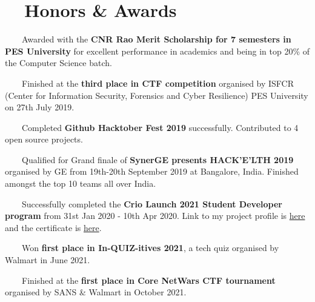 \documentclass[a4paper,20pt]{article}
\begin{document}
\section{~~Honors \& Awards}
\begin{description}[font=$\bullet$]
\item{~~~~Awarded with the \textbf{CNR Rao Merit Scholarship for 7 semesters in PES University} for excellent performance in academics and being in top 20\% of the Computer Science batch.}
\vspace{-5pt}
\item {~~~~Finished at the \textbf{third place in CTF competition} organised by ISFCR (Center for Information Security, Forensics and Cyber Resilience) PES University on 27th July 2019.}
\vspace{-5pt}
\item {~~~~Completed \textbf{Github Hacktober Fest 2019} successfully. Contributed to 4 open source projects.}
\vspace{-5pt}
\item {~~~~Qualified for Grand finale of \textbf{SynerGE presents HACK'E'LTH 2019} organised by GE from 19th-20th September 2019 at Bangalore, India. Finished amongst the top 10 teams all over India.}
\vspace{-5pt}
\item {~~~~Successfully completed the \textbf{Crio Launch 2021 Student Developer program} from 31st Jan 2020 - 10th Apr 2020. Link to my project profile is {\color{blue}\href{https://criodo.github.io/Crio-Launch-Feb-2020-jai-bhageria/}{here}} and the certificate is {\color{blue}\href{https://raw.githubusercontent.com/CrioDo/Crio-Launch-Feb-2020-jai-bhageria/gh-pages/static/media/Crio-Launch-Feb-2020-Certificate.png}{here}}.}
\vspace{-5pt}
\item {~~~~Won \textbf{first place in In-QUIZ-itives 2021}, a tech quiz organised by Walmart in June 2021.}
\vspace{-5pt}
\item {~~~~Finished at the \textbf{first place in Core NetWars CTF tournament} organised by SANS \& Walmart in October 2021.}
\end{description}
\end{document}
